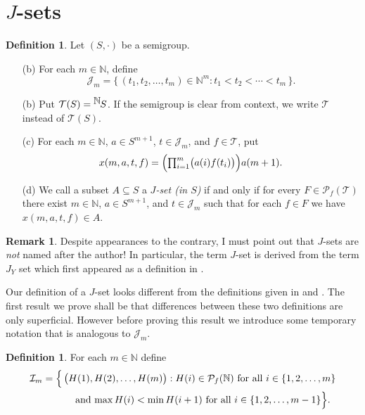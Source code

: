\documentclass[12pt]{article}
\theoremstyle{plain}
\theoremstyle{definition}
\newtheorem{defn}[thm]{Definition}
\newtheorem{rmk}[thm]{Remark}
\newcommand{\bbN}{\mathbb{N}}
\newcommand{\calI}{\mathcal{I}}
\newcommand{\calJ}{\mathcal{J}}
\newcommand{\calT}{\mathcal{T}}
\newcommand{\Pf}{\mathcal{P}_f}
\newcommand{\setfunc}[2]{\hbox{${}^{\hbox{$#1$}}\hskip -1 pt #2$}}
\begin{document}
\section{$J$-sets}
\begin{defn}
  Let $(S, \cdot)$ be a semigroup.
  \begin{itemize}
    \item[(b)] For each $m \in \bbN$, define
      \[
        \calJ_m = \{\, (t_1, t_2, \ldots, t_m) \in \bbN^m : t_1 < t_2 < \cdots < t_m \,\}.
      \]

    \item[(b)] Put $\calT(S) = \setfunc{\bbN}{S}$.
      If the semigroup is clear from context, we write $\calT$ instead of $\calT(S)$.

    \item[(c)] For each $m \in \bbN$, $a \in S^{m+1}$, $t \in \calJ_m$, and $f \in \calT$, put
      \[
        \textstyle
        x(m, a, t, f) = \Bigl( \prod_{i=1}^m \bigl( a(i)f(t_i) \bigr) \Bigr)a(m+1).
      \]

    \item[(d)] We call a subset $A \subseteq S$ a \textsl{$J$-set (in $S$)} if and only if for every $F \in \Pf(\calT)$ there exist $m \in \bbN$, $a \in S^{m+1}$, and $t \in \calJ_m$ such that for each $f \in F$ we have $x(m, a, t, f) \in A$.
  \end{itemize}
\end{defn}
\begin{rmk}
  Despite appearances to the contrary, I must point out that $J$-sets are \textsl{not} named after the author!
  In particular, the term $J$-set is derived from the term $J_Y$ set which first appeared as a definition in \cite[Definition 2.4(b)]{Hindman:1996fk}.
\end{rmk}

Our definition of a $J$-set looks different from the definitions given in \cite[Definition 2.2(a)]{Hindman:2009vn} and \cite[Definition 3.3(d)]{De:2008uq}.
The first result we prove shall be that differences between these two definitions are only superficial. 
However before proving this result we introduce some temporary notation that is analogous to $\calJ_m$.

\begin{defn}
  For each $m \in \bbN$ define
  \begin{align*}
    \calI_m &= \Bigl\{\, \bigl( H(1), H(2), \ldots, H(m) \bigr) : \hbox{$H(i) \in \mathcal{P}_f(\bbN)$ for all $i \in \{1, 2, \ldots, m\}$} \\
        &\hspace{3em} \hbox{ and $\max H(i) < \min H(i+1)$ for all $i \in \{1, 2, \ldots, m-1\}$} \Bigr\}.
  \end{align*}
\end{defn}
\end{document}

